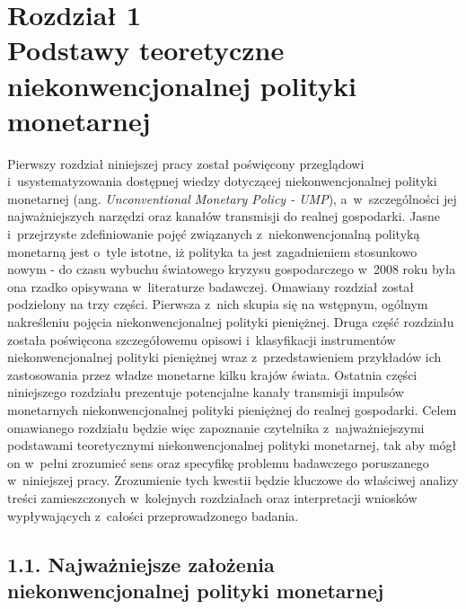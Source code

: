 \newpage
\chapter*{Rozdział 1 \\ \vspace{1cm} \Large{Podstawy teoretyczne niekonwencjonalnej polityki monetarnej}}

\noindent Pierwszy rozdział niniejszej pracy został poświęcony przeglądowi i~usystematyzowania dostępnej wiedzy dotyczącej niekonwencjonalnej polityki monetarnej (ang. \textit{Unconventional Monetary Policy - UMP}),  a~w~szczególności jej najważniejszych narzędzi oraz kanałów transmisji do realnej gospodarki. Jasne i~przejrzyste zdefiniowanie pojęć związanych z~niekonwencjonalną polityką monetarną jest o~tyle istotne, iż polityka ta jest zagadnieniem stosunkowo nowym - do czasu wybuchu światowego kryzysu gospodarczego w~2008 roku była ona rzadko opisywana w~literaturze badawczej. Omawiany rozdział został podzielony na trzy części. Pierwsza z~nich skupia się na wstępnym, ogólnym nakreśleniu pojęcia niekonwencjonalnej polityki pieniężnej. Druga część rozdziału została poświęcona szczegółowemu opisowi i~klasyfikacji instrumentów niekonwencjonalnej polityki pieniężnej wraz z~przedstawieniem przykładów ich zastosowania przez władze monetarne kilku krajów świata. Ostatnia części niniejszego rozdziału prezentuje potencjalne kanały transmisji impulsów monetarnych niekonwencjonalnej polityki pieniężnej do realnej gospodarki. Celem omawianego rozdziału będzie więc zapoznanie czytelnika z~najważniejszymi podstawami teoretycznymi  niekonwencjonalnej polityki monetarnej, tak aby mógł on w~pełni zrozumieć sens oraz specyfikę problemu badawczego poruszanego w~niniejszej pracy. Zrozumienie tych kwestii będzie kluczowe do właściwej analizy treści zamieszczonych w~kolejnych rozdziałach oraz interpretacji wniosków wypływających z~całości przeprowadzonego badania.

\hypertarget{podroz11}{}
\section*{\large{1.1. Najważniejsze założenia niekonwencjonalnej polityki monetarnej}}

